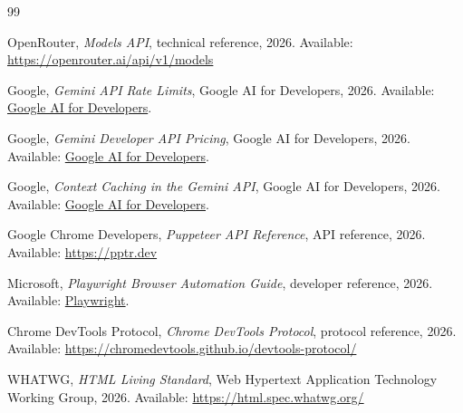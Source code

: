 \documentclass[12pt,a4paper,twoside]{report}
\begin{document}
\tableofcontents
\clearpage
\listoffigures
\clearpage
\listoftables
\clearpage












\clearpage
{}
{}
\begingroup
\small
\begin{thebibliography}{99}


OpenRouter,
\emph{Models API},
technical reference, 2026.
Available: \url{https://openrouter.ai/api/v1/models}

Google,
\emph{Gemini API Rate Limits},
Google AI for Developers, 2026.
Available: \href{https://ai.google.dev/gemini-api/docs/rate-limits}{Google AI for Developers}.

Google,
\emph{Gemini Developer API Pricing},
Google AI for Developers, 2026.
Available: \href{https://ai.google.dev/gemini-api/docs/pricing}{Google AI for Developers}.

Google,
\emph{Context Caching in the Gemini API},
Google AI for Developers, 2026.
Available: \href{https://ai.google.dev/gemini-api/docs/caching}{Google AI for Developers}.


Google Chrome Developers,
\emph{Puppeteer API Reference},
API reference, 2026.
Available: \url{https://pptr.dev}

Microsoft,
\emph{Playwright Browser Automation Guide},
developer reference, 2026.
Available: \href{https://playwright.dev/docs/intro}{Playwright}.

Chrome DevTools Protocol,
\emph{Chrome DevTools Protocol},
protocol reference, 2026.
Available: \url{https://chromedevtools.github.io/devtools-protocol/}


WHATWG,
\emph{HTML Living Standard},
Web Hypertext Application Technology Working Group, 2026.
Available: \url{https://html.spec.whatwg.org/}


\end{thebibliography}
\end{document}
